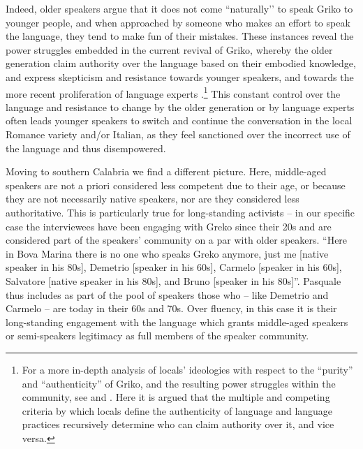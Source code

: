 \documentclass[output=paper,hidelinks]{langscibook}
\begin{document}
Indeed, older speakers argue that it does not come ``naturally'’ to speak Griko to younger people, and when approached by someone who makes an effort to speak the language, they tend to make fun of their mistakes. These instances reveal the power struggles embedded in the current revival of Griko, whereby the older generation claim authority over the language based on their embodied knowledge, and express skepticism and resistance towards younger speakers, and towards the more recent proliferation of language experts \citep{Pellegrino2016b, Pellegrino2021}.\footnote{For a more in-depth analysis of locals' ideologies with respect to the ``purity'' and ``authenticity'' of Griko, and the resulting power struggles within the community, see \citealt{Pellegrino2016b} and \citeyear{Pellegrino2021}. Here it is argued that the multiple and competing criteria by which locals define the authenticity of language and language practices recursively determine who can claim authority over it, and vice versa.} This constant control over the language and resistance to change by the older generation or by language experts often leads younger speakers to switch and continue the conversation in the local Romance variety and/or Italian, as they feel sanctioned over the incorrect use of the language and thus disempowered.



Moving to southern Calabria we find a different picture. Here, middle-aged speakers are not a priori considered less competent due to their age, or because they are not necessarily native speakers, nor are they considered less authoritative. This is particularly true for long-standing activists -- in our specific case the interviewees have been engaging with Greko since their 20s and are considered part of the speakers' community on a par with older speakers. “Here in Bova Marina there is no one who speaks Greko anymore, just me [native speaker in his 80s], Demetrio [speaker in his 60s], Carmelo [speaker in his 60s], Salvatore [native speaker in his 80s], and Bruno [speaker in his 80s]”. Pasquale thus includes as part of the pool of speakers those who -- like Demetrio and Carmelo -- are today in their 60s and 70s. Over fluency, in this case it is their long-standing engagement with the language which grants middle-aged speakers or semi-speakers legitimacy as full members of the speaker community.
\end{document}
